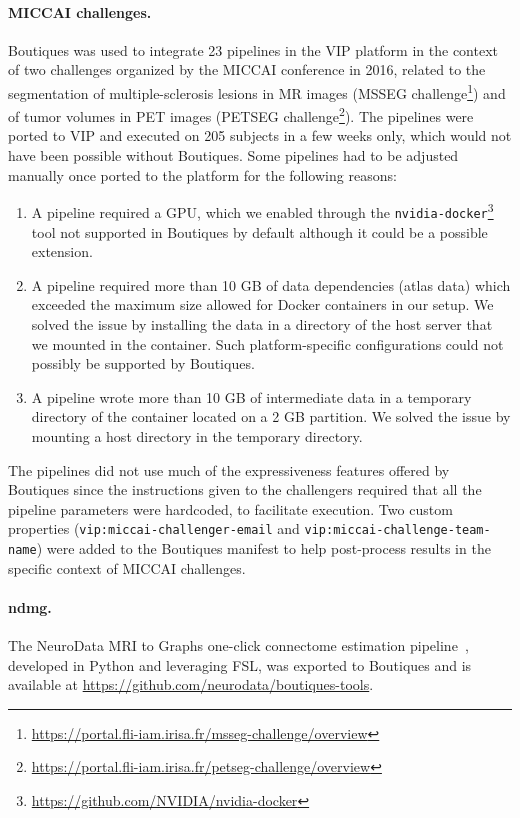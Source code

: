 \documentclass{article}
\newcommand{\boutiques}{Boutiques\xspace}
\begin{document}
\paragraph{MICCAI challenges.}
Boutiques was used to integrate 23 pipelines in the VIP platform in
the context of two challenges organized by the MICCAI conference in
2016, related to the segmentation of multiple-sclerosis lesions in MR
images (MSSEG
challenge\footnote{\url{https://portal.fli-iam.irisa.fr/msseg-challenge/overview}})
and of tumor volumes in PET images (PETSEG
challenge\footnote{\url{https://portal.fli-iam.irisa.fr/petseg-challenge/overview}}). The
pipelines were ported to VIP and executed on 205 subjects in a few
weeks only, which would not have been possible without
\boutiques. Some pipelines had to be adjusted manually once ported to
the platform for the following reasons:
\begin{enumerate}
\item A pipeline
  required a GPU, which we enabled through the
  \texttt{nvidia-docker}\footnote{\url{https://github.com/NVIDIA/nvidia-docker}}
  tool not supported in Boutiques by default although it could be a possible extension.
\item A pipeline required more than 10 GB of data dependencies (atlas
  data) which exceeded the maximum size allowed for Docker containers
  in our setup. We solved the issue by installing the data in a
  directory of the host server that we mounted in the container. Such
  platform-specific configurations could not possibly be supported by
  \boutiques.
\item A pipeline wrote more than 10 GB of intermediate data in a
  temporary directory of the container located on a 2 GB partition. We
  solved the issue by mounting a host directory in the temporary directory.
\end{enumerate}
The pipelines did not use much of the expressiveness features offered
by Boutiques since the instructions given to the challengers required
that all the pipeline parameters were hardcoded, to facilitate
execution. Two custom properties (\texttt{vip:miccai-challenger-email}
and \texttt{vip:miccai-challenge-team-name}) were added to the
\boutiques manifest to help post-process results in the specific
context of MICCAI challenges.

\paragraph{ndmg.} The NeuroData MRI to Graphs one-click connectome estimation
pipeline~\cite{kiar2016ndmg}, developed in Python and leveraging FSL, was
exported to \boutiques and is available at \url{https://github.com/neurodata/boutiques-tools}.
\end{document}
